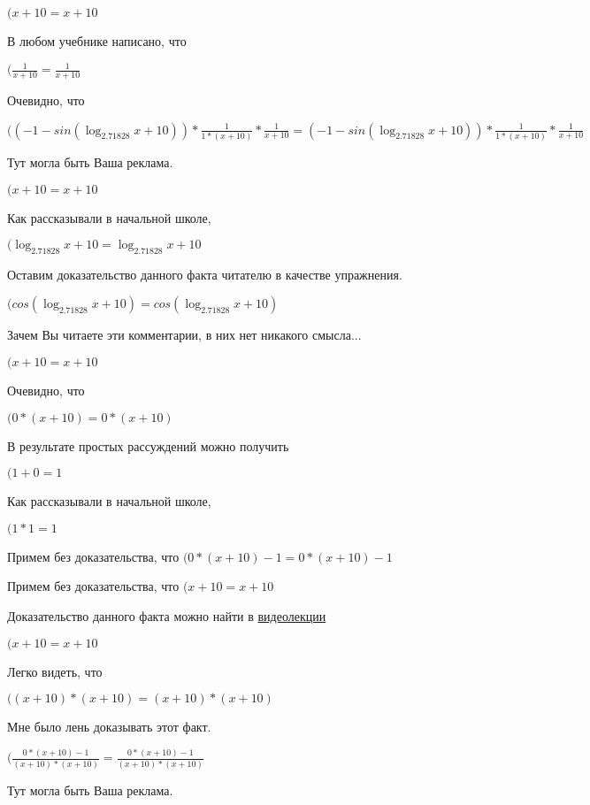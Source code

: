 \documentclass[12pt,a4paper,fleqn]{article}
\theoremstyle{definition}
\begin{document}
$( x  +  10  =  x  +  10 $

В любом учебнике написано, что

$(\frac{ 1 }{ x  +  10 }
 = \frac{ 1 }{ x  +  10 }
$

Очевидно, что

$(( -1  - sin(\log_{ 2.71828 }{ x  +  10 })) * \frac{ 1 }{ 1  * ( x  +  10 )}
 * \frac{ 1 }{ x  +  10 }
 = ( -1  - sin(\log_{ 2.71828 }{ x  +  10 })) * \frac{ 1 }{ 1  * ( x  +  10 )}
 * \frac{ 1 }{ x  +  10 }
$

Тут могла быть Ваша реклама.

$( x  +  10  =  x  +  10 $

Как рассказывали в начальной школе,

$(\log_{ 2.71828 }{ x  +  10 } = \log_{ 2.71828 }{ x  +  10 }$

Оставим доказательство данного факта читателю в качестве упражнения.

$(cos(\log_{ 2.71828 }{ x  +  10 }) = cos(\log_{ 2.71828 }{ x  +  10 })$

Зачем Вы читаете эти комментарии, в них нет никакого смысла...

$( x  +  10  =  x  +  10 $

Очевидно, что

$( 0  * ( x  +  10 ) =  0  * ( x  +  10 )$

В результате простых рассуждений можно получить

$( 1  +  0  =  1 $

Как рассказывали в начальной школе,

$( 1  *  1  =  1 $

Примем без доказательства, что
$( 0  * ( x  +  10 ) -  1  =  0  * ( x  +  10 ) -  1 $

Примем без доказательства, что
$( x  +  10  =  x  +  10 $

Доказательство данного факта можно найти в \href{https://www.youtube.com/watch?v=dQw4w9WgXcQ}{видеолекции}

$( x  +  10  =  x  +  10 $

Легко видеть, что

$(( x  +  10 ) * ( x  +  10 ) = ( x  +  10 ) * ( x  +  10 )$

Мне было лень доказывать этот факт.

$(\frac{ 0  * ( x  +  10 ) -  1 }{( x  +  10 ) * ( x  +  10 )}
 = \frac{ 0  * ( x  +  10 ) -  1 }{( x  +  10 ) * ( x  +  10 )}
$

Тут могла быть Ваша реклама.
\end{document}
